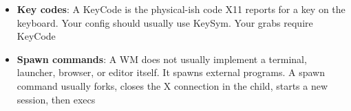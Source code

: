\documentclass{report}
\begin{document}
\begin{itemize}
\begin{cppcode}
                XK_Tab
                XK_space
                XK_j
                XK_k
                XK_h
                XK_l
                XK_1
                XK_q
            \end{cppcode}
            \bigbreak \noindent 
            These are layout-level symbolic names. You generally write your config using KeySyms because they are readable.
            \bigbreak \noindent 
            Internally you store keysyms, then when registering a grab you convert it to a keycode.
        \item \textbf{Key codes}: A KeyCode is the physical-ish code X11 reports for a key on the keyboard.
            \bigbreak \noindent 
            Your config should usually use KeySym.
            \bigbreak \noindent 
            Your grabs require KeyCode
        \item \textbf{Spawn commands}: A WM does not usually implement a terminal, launcher, browser, or editor itself. It spawns external programs.
            \bigbreak \noindent 
            A spawn command usually forks, closes the X connection in the child, starts a new session, then execs
        

    \end{itemize}
\end{document}
